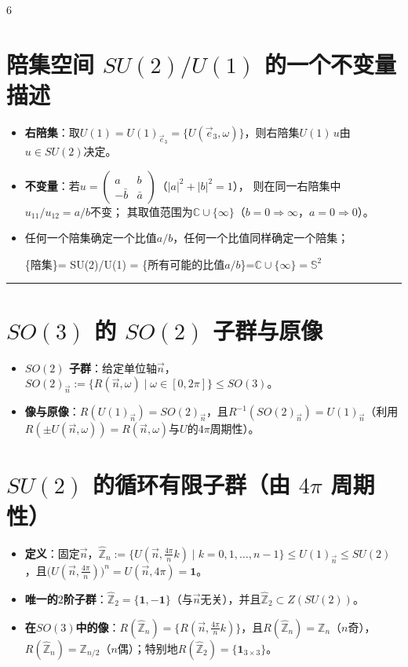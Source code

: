 \documentclass[landscape]{article}
\begin{document}
\begin{multicols*}{6}
\section*{陪集空间 $SU(2)/U(1)$ 的一个不变量描述}
\begin{itemize}
  \item \textbf{右陪集}：取$U(1)=U(1)_{\vec e_3}=\{U(\vec e_3,\omega)\}$，则右陪集$U(1)\,u$由$u\in SU(2)$决定。
  \item \textbf{不变量}：若$u=\begin{pmatrix} a & b \\ -\bar b & \bar a \end{pmatrix}$（$|a|^2+|b|^2=1$），
  则在同一右陪集中$u_{11}/u_{12}=a/b$不变；
  其取值范围为$\mathbb{C}\cup\{\infty\}$（$b=0\Rightarrow \infty$，$a=0\Rightarrow 0$）。
  \item 任何一个陪集确定一个比值$a/b$，任何一个比值同样确定一个陪集；
  
  \{陪集\}= SU(2)/U(1) = \{所有可能的比值$a/b$\}=$\mathbb{C}\cup\{\infty\}=\mathbb{S}^2$
\end{itemize}
\noindent\textcolor{blue}{\rule{\linewidth}{1pt}}
\section*{$SO(3)$ 的 $SO(2)$ 子群与原像}
\begin{itemize}
  \item \textbf{$SO(2)$ 子群}：给定单位轴$\vec n$，$SO(2)_{\vec n}:=\{R(\vec n,\omega)\mid \omega\in[0,2\pi]\}\le SO(3)$。
  \item \textbf{像与原像}：$R(U(1)_{\vec n})=SO(2)_{\vec n}$，且$R^{-1}(SO(2)_{\vec n})=U(1)_{\vec n}$（利用$R(\pm U(\vec n,\omega))=R(\vec n,\omega)$与$U$的$4\pi$周期性）。
\end{itemize}

\section*{$SU(2)$ 的循环有限子群（由 $4\pi$ 周期性）}
\begin{itemize}
  \item \textbf{定义}：固定$\vec n$，$\widehat{\mathbb{Z}}_{n}:=\{U(\vec n,\tfrac{4\pi}{n}k)\mid k=0,1,\dots,n-1\}\le U(1)_{\vec n}\le SU(2)$，且$\big(U(\vec n,\tfrac{4\pi}{n})\big)^n=U(\vec n,4\pi)=\mathbf{1}$。
  \item \textbf{唯一的$2$阶子群}：$\widehat{\mathbb{Z}}_{2}=\{\mathbf{1},-\mathbf{1}\}$（与$\vec n$无关），并且$\widehat{\mathbb{Z}}_{2}\subset Z(SU(2))$。
  \item \textbf{在$SO(3)$中的像}：$R(\widehat{\mathbb{Z}}_{n})=\{R(\vec n,\tfrac{4\pi}{n}k)\}$，且$R(\widehat{\mathbb{Z}}_{n})=\mathbb{Z}_{n}$（$n$奇），$R(\widehat{\mathbb{Z}}_{n})=\mathbb{Z}_{n/2}$（$n$偶）；特别地$R(\widehat{\mathbb{Z}}_{2})=\{\mathbf{1}_{3\times3}\}$。
\end{itemize}


\end{multicols*}
\end{document}
